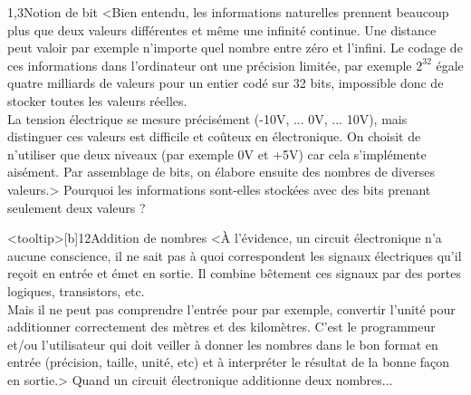\begin{quiz}[title={Représentation de l'information}]
\begin{quizquestion*}[c]{2}{1,3}{Notion de bit}
<Bien entendu, les informations naturel\-les prennent beaucoup plus que deux valeurs différentes et même une infini\-té continue. Une distance peut valoir par exemple n'importe quel nombre entre zéro et l'infini. Le codage de ces informations dans l'ordinateur ont une précision limitée, par exemple $2^{32}$ égale quatre milliards de valeurs pour un entier codé sur 32 bits, impossible donc de stocker toutes les valeurs réelles.\\
La tension électrique se mesure précisément (-10V, ... 0V, ... 10V), mais distinguer ces valeurs est difficile et coûteux en électronique. On choisit de n'utiliser que deux niveaux (par exemple 0V et +5V) car cela s'implémente aisément. Par assemblage de bits, on élabore ensuite des nombres de diverses valeurs.>
Pourquoi les informations sont-elles stockées avec des bits prenant seulement deux valeurs ?
\end{quizquestion*}

\begin{quizquestion*}<tooltip>[b]{1}{2}{Addition de nombres}
<À l'évidence, un circuit électronique n'a aucune conscience, il ne sait pas à quoi correspondent les signaux électriques qu'il reçoit en entrée et émet en sortie. Il combine bêtement ces signaux par des portes logiques, transistors, etc.\\
Mais il ne peut pas comprendre l'entrée pour par exemple, convertir l'unité pour additionner correctement des mètres et des kilomètres. C'est le programmeur et/ou l'utilisateur qui doit veiller à donner les nombres dans le bon format en entrée (précision, taille, unité, etc) et à interpréter le résultat de la bonne façon en sortie.>
Quand un circuit électronique additionne deux nombres...
\end{quizquestion*}


\end{quiz}
